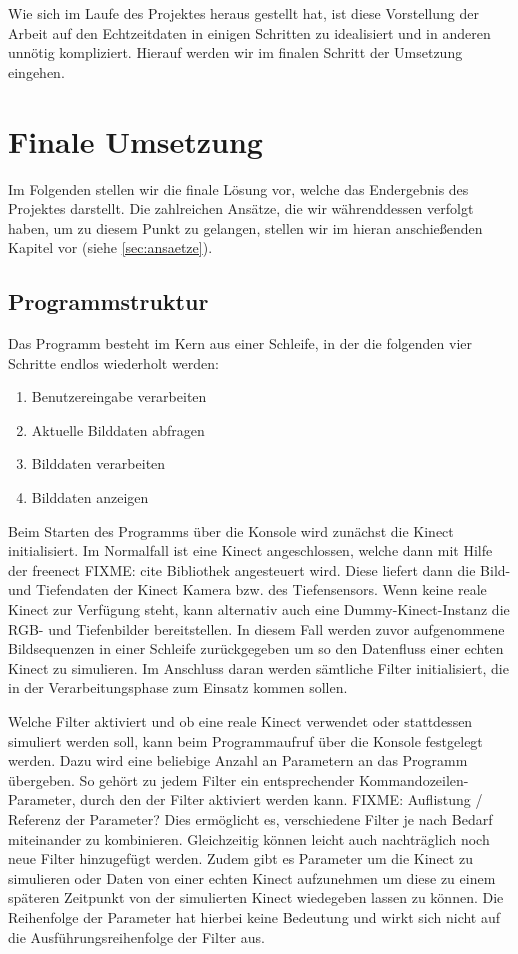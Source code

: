 \documentclass[12pt,a4paper,ngerman]{scrartcl}
\begin{document}
Wie sich im Laufe des Projektes heraus gestellt hat, ist diese Vorstellung der Arbeit
auf den Echtzeitdaten in einigen Schritten zu idealisiert und in anderen unnötig
kompliziert. Hierauf werden wir im finalen Schritt der Umsetzung eingehen.

\section{Finale Umsetzung}
\label{sec:final}

Im Folgenden stellen wir die finale Lösung vor, welche das Endergebnis des
Projektes darstellt. Die zahlreichen Ansätze, die wir währenddessen verfolgt haben, um zu
diesem Punkt zu gelangen, stellen wir im hieran anschießenden Kapitel vor (siehe \ref{sec:ansaetze}).

\subsection{Programmstruktur}

Das Programm besteht im Kern aus einer Schleife, in der die folgenden vier Schritte endlos wiederholt werden:
\begin{enumerate}
  \item Benutzereingabe verarbeiten
  \item Aktuelle Bilddaten abfragen
  \item Bilddaten verarbeiten
  \item Bilddaten anzeigen
\end{enumerate}

Beim Starten des Programms über die Konsole wird zunächst die Kinect initialisiert.
Im Normalfall ist eine Kinect angeschlossen, welche dann mit Hilfe der freenect {\color{red}FIXME: cite} Bibliothek angesteuert wird. Diese liefert dann die Bild- und Tiefendaten der Kinect Kamera bzw. des Tiefensensors. Wenn keine reale Kinect zur Verfügung steht, kann alternativ auch eine Dummy-Kinect-Instanz die RGB- und Tiefenbilder bereitstellen. In diesem Fall werden zuvor aufgenommene Bildsequenzen in einer Schleife zurückgegeben um so den Datenfluss einer echten Kinect zu simulieren.
Im Anschluss daran werden sämtliche Filter initialisiert, die in der Verarbeitungsphase zum Einsatz kommen sollen.

Welche Filter aktiviert und ob eine reale Kinect verwendet oder stattdessen simuliert werden soll, kann beim Programmaufruf über die Konsole festgelegt werden. Dazu wird eine beliebige Anzahl an Parametern an das Programm übergeben. So gehört zu jedem Filter ein entsprechender Kommandozeilen-Parameter, durch den der Filter aktiviert werden kann. {\color{red}FIXME: Auflistung / Referenz der Parameter?} Dies ermöglicht es, verschiedene Filter je nach Bedarf miteinander zu kombinieren. Gleichzeitig können leicht auch nachträglich noch neue Filter hinzugefügt werden. Zudem gibt es Parameter um die Kinect zu simulieren oder Daten von einer echten Kinect aufzunehmen um diese zu einem späteren Zeitpunkt von der simulierten Kinect wiedegeben lassen zu können. Die Reihenfolge der Parameter hat hierbei keine Bedeutung und wirkt sich nicht auf die Ausführungsreihenfolge der Filter aus.
\end{document}

